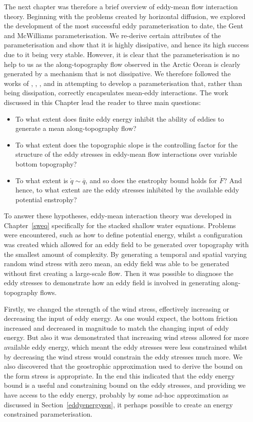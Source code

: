 \documentclass[12pt,a4paper]{report}
\newcommand*\thkmean[1]{\overline{#1}}
\newcommand*\spec[1]{\mathring{#1}}
\newcommand*\secref[1]{Section~\ref{#1}}
\begin{document}
The next chapter was therefore a brief overview of eddy-mean flow interaction theory.
Beginning with the problems created by horizontal diffusion, we explored the development
of the most successful eddy parameterisation to date, the Gent and McWilliams parameterisation. We re-derive certain attributes of the parameterisation and show
that it is highly dissipative, and hence its high success due to it being very stable. 
However, it is clear that the parameterisation is no help to us as the along-topography
flow observed in the Arctic Ocean is clearly generated by a mechanism that is not 
dissipative. We therefore followed the works of \cite{greatbatch1998exploring}, \cite{adcock2000interactions}, \cite{young2012exact}, \cite{marshall2012framework} and
\cite{maddison2013eliassen} in attempting to develop a parameterisation that,
rather than being dissipation, correctly encapsulates mean-eddy interactions.
The work discussed in this Chapter lead the reader to three main questions:
\begin{itemize} 
	\item To what extent does finite eddy energy inhibit the ability of eddies to
	generate a mean along-topography flow?
	\item To what extent does the topographic slope is the controlling factor for the structure of the eddy stresses in eddy-mean flow interactions over variable bottom topography?
	\item To what extent is $\spec{q} \sim \thkmean{q}$, and so does the enstrophy bound holds for $\spec{F}$? And hence, to what extent are  the eddy stresses inhibited by the available eddy potential enstrophy?
\end{itemize} 

To answer these hypotheses, eddy-mean interaction theory was developed in Chapter~\ref{sweq}
specifically for the stacked shallow water equations. Problems were encountered, such
as how to define potential energy, whilst a configuration was created which allowed
for an eddy field to be generated over topography with the smallest amount of complexity.
By generating a temporal and spatial varying random wind stress with zero mean,
an eddy field was able to be generated without first creating a large-scale flow. Then
it was possible to diagnose the eddy stresses to demonstrate how an eddy field is
involved in generating along-topography flows. 

Firstly, we changed the strength of the
wind stress, effectively increasing or decreasing the input of eddy energy. As one would
expect, the bottom friction increased and decreased in magnitude to match the changing
input of eddy energy. But also it was demonstrated that increasing wind stress
allowed for more available eddy energy, which meant the eddy stresses were less constrained
whilst by decreasing the wind stress would constrain the eddy stresses much more.
We also discovered that the geostrophic approximation used to derive the
bound on the form stress is appropriate. In the end this indicated that the eddy energy
bound is a useful and constraining bound on the eddy stresses, and providing we have
access to the eddy energy, probably by some ad-hoc approximation as discussed in
\secref{eddyenergyeqs}, it perhaps possible to create an energy constrained parameterisation.
\end{document}
